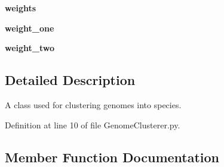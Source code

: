 \begin{DoxyCompactItemize}
\item 
{\bfseries weights}\hypertarget{class_n_e_a_t___py_genetics_1_1_n_e_a_t_1_1_analyst_1_1_genome_clusterer_1_1_genome_clusterer_aff7fba61d7cd8eeeed9149ed48211699}{}\label{class_n_e_a_t___py_genetics_1_1_n_e_a_t_1_1_analyst_1_1_genome_clusterer_1_1_genome_clusterer_aff7fba61d7cd8eeeed9149ed48211699}

\item 
{\bfseries weight\+\_\+one}\hypertarget{class_n_e_a_t___py_genetics_1_1_n_e_a_t_1_1_analyst_1_1_genome_clusterer_1_1_genome_clusterer_ac1f8f1740d1a6663cc8fb29fe29f3c35}{}\label{class_n_e_a_t___py_genetics_1_1_n_e_a_t_1_1_analyst_1_1_genome_clusterer_1_1_genome_clusterer_ac1f8f1740d1a6663cc8fb29fe29f3c35}

\item 
{\bfseries weight\+\_\+two}\hypertarget{class_n_e_a_t___py_genetics_1_1_n_e_a_t_1_1_analyst_1_1_genome_clusterer_1_1_genome_clusterer_a2541d20300efb0cff96a18abb6a85d81}{}\label{class_n_e_a_t___py_genetics_1_1_n_e_a_t_1_1_analyst_1_1_genome_clusterer_1_1_genome_clusterer_a2541d20300efb0cff96a18abb6a85d81}

\end{DoxyCompactItemize}


\subsection{Detailed Description}
\begin{DoxyVerb}A class used for clustering genomes into species.
\end{DoxyVerb}
 

Definition at line 10 of file Genome\+Clusterer.\+py.



\subsection{Member Function Documentation}
